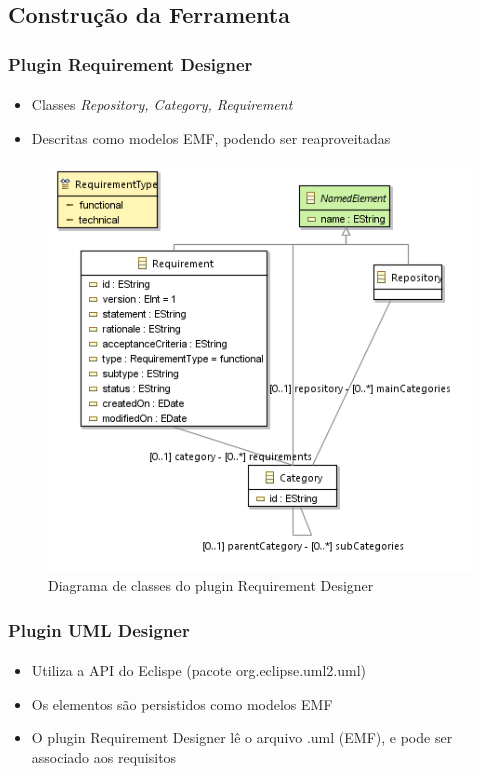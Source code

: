 \documentclass{beamer}
\begin{document}
\subsection[Construção da Ferramenta]{Construção da Ferramenta}

\begin{frame}
\frametitle{Plugin Requirement Designer}
\framesubtitle{}

\begin{itemize}
  \item Classes \textit{Repository, Category, Requirement}
  \item Descritas como modelos EMF, podendo ser reaproveitadas
\end{itemize}

\begin{figure}[htbp] \centering
	\includegraphics[width=\textwidth,height=.50\textheight,keepaspectratio]{./img/requirement_package_entities.png}
	\caption{Diagrama de classes do plugin Requirement Designer}
	\label{fig:reqdesigner}
\end{figure}

\end{frame}

\begin{frame}
\frametitle{Plugin UML Designer}
\framesubtitle{}

\begin{itemize}
  \item Utiliza a API do Eclispe (pacote org.eclipse.uml2.uml)
  \item Os elementos são persistidos como modelos EMF
  \item O plugin Requirement Designer lê o arquivo .uml (EMF), e pode ser associado aos requisitos  
\end{itemize}

\end{frame}
\end{document}
